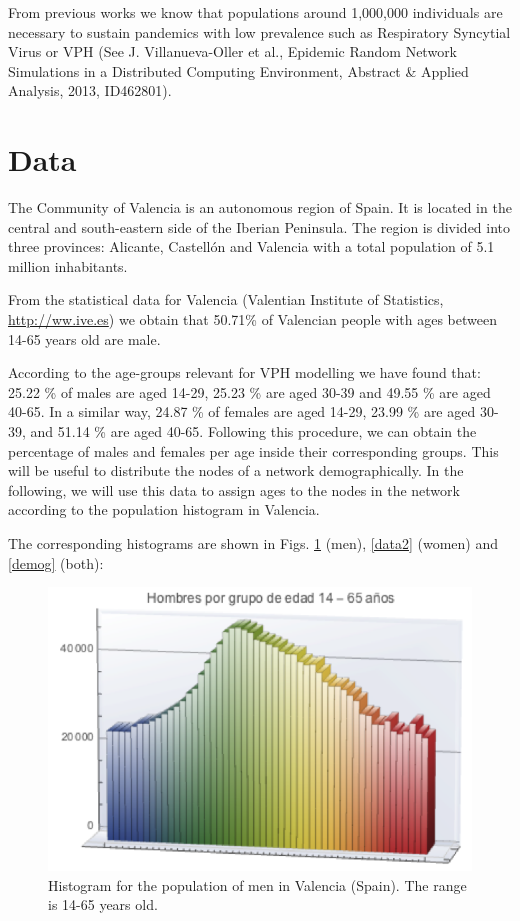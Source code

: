 From previous works we know that populations around 1,000,000 individuals are necessary to sustain pandemics with low prevalence such as Respiratory Syncytial Virus or VPH (See J. Villanueva-Oller et al., Epidemic Random Network Simulations in a Distributed Computing Environment, Abstract \& Applied Analysis, 2013, ID462801). 

\section{Data}
The Community of Valencia is an autonomous region of Spain. It is located in the central and south-eastern side of the Iberian Peninsula. The region is divided into three provinces: Alicante, Castell\'on and Valencia with a total population of 5.1 million inhabitants.

From the statistical data for Valencia (Valentian Institute of Statistics, \url{http://ww.ive.es}) we obtain that 50.71\% of Valencian people with ages between 14-65 years old are male. 

According to the age-groups relevant for VPH modelling we have found that: 25.22 \% of males are aged 14-29, 25.23 \% are aged 30-39 and 49.55 \% are aged 40-65. In a similar way, 24.87 \% of females are aged 14-29, 23.99 \% are aged 30-39, and 51.14 \% are aged 40-65. Following this procedure, we can obtain the percentage of males and females per age inside their corresponding groups. This will be useful to distribute the nodes of a network demographically. In the following, we will use this data to assign ages to the nodes in the network according to the population histogram in Valencia.

The corresponding histograms are shown in Figs. \ref{data1} (men), \ref{data2} (women) and \ref{demog} (both):

\begin{figure}[ht]
	\centering
	\includegraphics[scale=1.0]{IMG/data1.png}
	\caption{Histogram for the population of men in Valencia (Spain). The range is 14-65 years old.}
	\label{data1}
\end{figure} 

